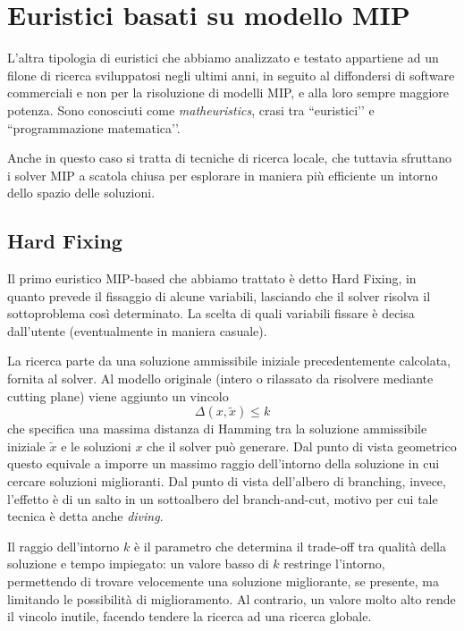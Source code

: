 \section{Euristici basati su modello MIP}
L’altra tipologia di euristici che abbiamo analizzato e testato appartiene ad un filone di ricerca sviluppatosi negli ultimi anni, in seguito al diffondersi di software commerciali e non per la risoluzione di modelli MIP, e alla loro sempre maggiore potenza. Sono conosciuti come \textit{matheuristics}, crasi tra ``euristici’’ e ``programmazione matematica’’.

Anche in questo caso si tratta di tecniche di ricerca locale, che tuttavia sfruttano i solver MIP a scatola chiusa per esplorare in maniera più efficiente un intorno dello spazio delle soluzioni.

\subsection{Hard Fixing}
Il primo euristico MIP-based che abbiamo trattato è detto Hard Fixing, in quanto prevede il fissaggio di alcune variabili, lasciando che il solver risolva il sottoproblema così determinato. La scelta di quali variabili fissare è decisa dall’utente (eventualmente in maniera casuale).

La ricerca parte da una soluzione ammissibile iniziale precedentemente calcolata, fornita al solver. Al modello originale (intero o rilassato da risolvere mediante cutting plane) viene aggiunto un vincolo
\begin{equation}
  \Delta(x, \tilde{x}) \leq k \label{eqn:hfconst}
\end{equation}
che specifica una massima distanza di Hamming tra la soluzione ammissibile iniziale $\tilde{x}$ e le soluzioni $x$ che il solver può generare. Dal punto di vista geometrico questo equivale a imporre un massimo raggio dell’intorno della soluzione in cui cercare soluzioni miglioranti. Dal punto di vista dell’albero di branching, invece, l’effetto è di un salto in un sottoalbero del branch-and-cut, motivo per cui tale tecnica è detta anche \textit{diving}.

Il raggio dell’intorno $k$ è il parametro che determina il trade-off tra qualità della soluzione e tempo impiegato: un valore basso di $k$ restringe l’intorno, permettendo di trovare velocemente una soluzione migliorante, se presente, ma limitando le possibilità di miglioramento. Al contrario, un valore molto alto rende il vincolo inutile, facendo tendere la ricerca ad una ricerca globale.

